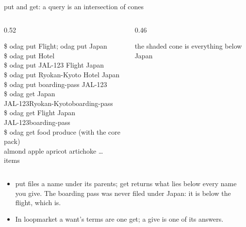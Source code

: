 \documentclass[aspectratio=169,11pt]{beamer}
\newcommand{\code}[1]{{\ttfamily #1}}
\begin{document}
{\begin{frame}{put and get: a query is an intersection of cones}
  \begin{columns}[T]
    \begin{column}{0.52\textwidth}
      {\scriptsize\ttfamily
        \textcolor{soft}{\$} odag put Flight; odag put Japan\\[0.4mm]
        \textcolor{soft}{\$} odag put Hotel\\[0.4mm]
        \textcolor{soft}{\$} odag put JAL-123 Flight Japan\\[0.4mm]
        \textcolor{soft}{\$} odag put Ryokan-Kyoto Hotel Japan\\[0.4mm]
        \textcolor{soft}{\$} odag put boarding-pass JAL-123\\[1.5mm]
        \textcolor{soft}{\$} odag get Japan\\[0.4mm]
        JAL-123\quad Ryokan-Kyoto\quad boarding-pass\\[1.5mm]
        \textcolor{soft}{\$} odag get Flight Japan\\[0.4mm]
        JAL-123\quad boarding-pass\\[1.5mm]
        \textcolor{soft}{\$} odag get food produce \textcolor{soft}{\rmfamily (with the core pack)}\\[0.4mm]
        almond apple apricot artichoke \dots\ \textcolor{soft}{ items}\par}
    \end{column}
    \begin{column}{0.46\textwidth}
      \centering
      \par
      \vspace{2mm}
      {\scriptsize\color{soft}the shaded cone is everything below Japan\par}
    \end{column}
  \end{columns}
  \vspace{3mm}
  \small
  \begin{itemize}\setlength{\itemsep}{1.2mm}
    \item \code{put} files a name under its parents; \code{get} returns what lies below every name you give. The boarding pass was never filed under Japan: it is below the flight, which is.
    \item In loopmarket a want's terms are one \code{get}; a give is one of its answers.
  \end{itemize}
\end{frame}

}
\end{document}
